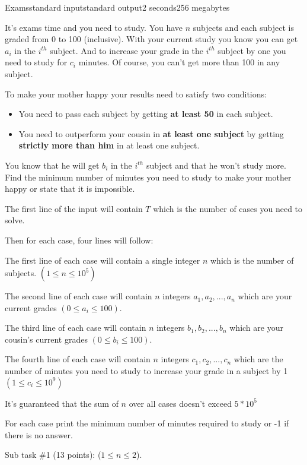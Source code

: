 \begin{problem}{Exams}{standard input}{standard output}{2 seconds}{256 megabytes}

It's exams time and you need to study. You have $n$ subjects and each subject is graded from 0 to 100 (inclusive). With your current study you know you can get $a_i$ in the $i^{th}$ subject. And to increase your grade in the $i^{th}$ subject by one you need to study for $c_{i}$ minutes. Of course, you can't get more than 100 in any subject.

To make your mother happy your results need to satisfy two conditions:
\begin{itemize}
\item You need to pass each subject by getting \textbf{at least 50} in each subject.
\item You need to outperform your cousin in \textbf{at least one subject} by getting \textbf{strictly more than him} in at least one subject.
\end{itemize}

You know that he will get $b_i$ in the $i^{th}$ subject and that he won't study more. Find the minimum number of minutes you need to study to make your mother happy or state that it is impossible.

\InputFile
The first line of the input will contain $T$ which is the number of cases you need to solve.

Then for each case, four lines will follow:

The first line of each case will contain a single integer $n$ which is the number of subjects. $(1 \le n \le 10^5)$

The second line of each case will contain $n$ integers $a_1,a_2,...,a_n$ which are your current grades $(0 \le a_i \le 100)$.

The third line of each case will contain $n$ integers $b_1,b_2,...,b_n$ which are your cousin's current grades $(0 \le b_i \le 100)$.

The fourth line of each case will contain $n$ integers $c_1,c_2,...,c_n$ which are the number of minutes you need to study to increase your grade in a subject by 1 $(1 \le c_i \le 10^9)$

It's guaranteed that the sum of $n$ over all cases doesn't exceed $5*10^5$

\OutputFile
For each case print the minimum number of minutes required to study or -1 if there is no answer.

\Scoring
Sub task \#1 (13 points): ($1 \leq n \leq 2$).


\end{problem}
